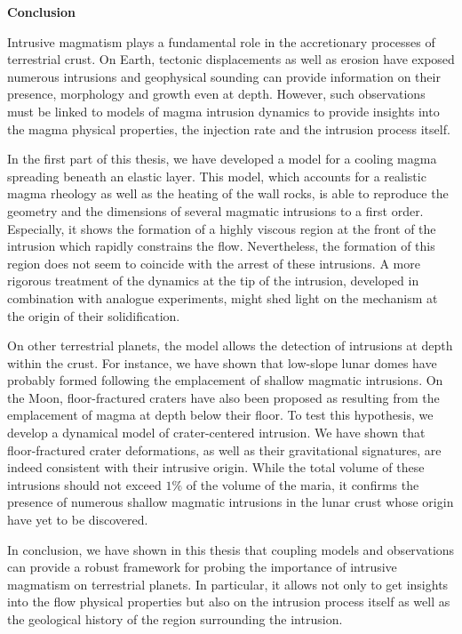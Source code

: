 \thispagestyle{plain}
\begin{center}
 \Large \vspace{.5cm} \textbf{Conclusion}
\end{center}

Intrusive  magmatism  plays a  fundamental  role  in the  accretionary
processes of  terrestrial crust.  On Earth,  tectonic displacements as
well  as  erosion have  exposed  numerous  intrusions and  geophysical
sounding  can provide  information on  their presence,  morphology and
growth even  at depth.  However,  such observations must be  linked to
models of magma intrusion dynamics to provide insights into the magma
physical properties, the injection rate and the intrusion process itself.

In the  first part  of this thesis,  we have developed  a model  for a
cooling magma spreading  beneath an elastic layer.   This model, which
accounts for a realistic magma rheology  as well as the heating of the
wall rocks,  is able to reproduce  the geometry and the  dimensions of
several magmatic  intrusions to a  first order.  Especially,  it shows
the formation of a highly viscous region at the front of the intrusion
which  rapidly constrains  the flow.   Nevertheless, the  formation of
this  region does  not  seem  to coincide  with  the  arrest of  these
intrusions.  A more  rigorous treatment of the dynamics at  the tip of
the  intrusion, developed  in combination  with analogue  experiments,
might  shed   light  on   the  mechanism  at   the  origin   of  their
solidification.

On  other  terrestrial planets,  the  model  allows the  detection  of
intrusions at  depth within  the crust.  For  instance, we  have shown
that  low-slope  lunar  domes   have  probably  formed  following  the
emplacement   of   shallow   magmatic  intrusions.    On   the   Moon,
floor-fractured craters have also been  proposed as resulting from the
emplacement  of  magma at  depth  below  their  floor.  To  test  this
hypothesis, we develop a dynamical model of crater-centered intrusion.
We have  shown that  floor-fractured crater  deformations, as  well as
their  gravitational  signatures,  are indeed  consistent  with  their
intrusive origin.  While  the total volume of  these intrusions should
not exceed $1\%$ of the volume  of the maria, it confirms the presence
of  numerous shallow  magmatic  intrusions in  the  lunar crust  whose
origin have yet to be discovered.

In conclusion, we  have shown in this thesis that  coupling models and
observations can provide a robust framework for probing the importance
of  intrusive magmatism  on  terrestrial planets.   In particular,  it
allows not only to get insights  into the flow physical properties but
also on the intrusion process itself as well as the geological history
of the region surrounding the intrusion.


\newpage

